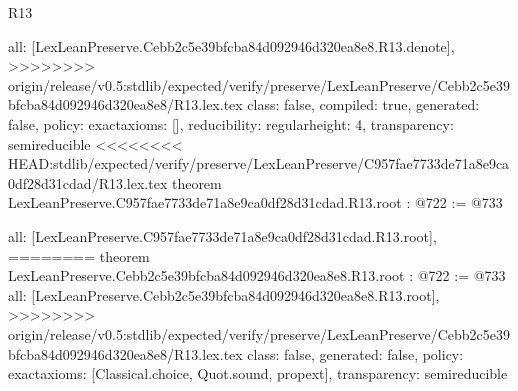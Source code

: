 \begin{lexlean}{R13}
\begin{coremodule}
{{{{{{{{{  all: [LexLeanPreserve.Cebb2c5e39bfcba84d092946d320ea8e8.R13.denote],
>>>>>>>> origin/release/v0.5:stdlib/expected/verify/preserve/LexLeanPreserve/Cebb2c5e39bfcba84d092946d320ea8e8/R13.lex.tex
  class: false,
  compiled: true,
  generated: false,
  policy: exact{axioms: []},
  reducibility: regular{height: 4},
  transparency: semireducible
}
<<<<<<<< HEAD:stdlib/expected/verify/preserve/LexLeanPreserve/C957fae7733de71a8e9ca0df28d31cdad/R13.lex.tex
theorem LexLeanPreserve.C957fae7733de71a8e9ca0df28d31cdad.R13.root : @722 := @733 {
  all: [LexLeanPreserve.C957fae7733de71a8e9ca0df28d31cdad.R13.root],
========
theorem LexLeanPreserve.Cebb2c5e39bfcba84d092946d320ea8e8.R13.root : @722 := @733 {
  all: [LexLeanPreserve.Cebb2c5e39bfcba84d092946d320ea8e8.R13.root],
>>>>>>>> origin/release/v0.5:stdlib/expected/verify/preserve/LexLeanPreserve/Cebb2c5e39bfcba84d092946d320ea8e8/R13.lex.tex
  class: false,
  generated: false,
  policy: exact{axioms: [Classical.choice, Quot.sound, propext]},
  transparency: semireducible
}

}}}}}}}}}
\end{coremodule}
\end{lexlean}
